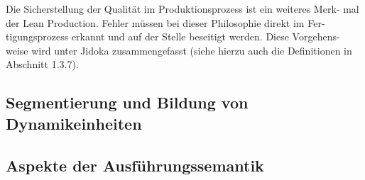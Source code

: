 Die Sicherstellung der Qualität im Produktionsprozess ist ein weiteres Merk- mal der Lean Production. Fehler müssen bei dieser Philosophie direkt im Fer- tigungsprozess erkannt und auf der Stelle beseitigt werden. Diese Vorgehens- weise wird unter Jidoka zusammengefasst (siehe hierzu auch die Definitionen in Abschnitt 1.3.7).


\subsection{Segmentierung und Bildung von Dynamikeinheiten}


\subsection{Aspekte der Ausführungssemantik}

